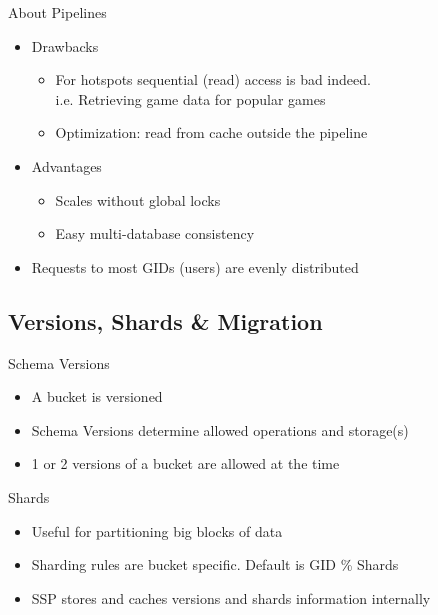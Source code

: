 \documentclass[aspectratio=169]{beamer}
\begin{document}
\begin{frame}{About Pipelines}
    \begin{itemize}
        \item Drawbacks
            \begin{itemize}
                \item For hotspots sequential (read) access is bad indeed.\\
                    i.e. Retrieving game data for popular games
                \item Optimization: read from cache outside the pipeline
            \end{itemize}
        \pause
        \item Advantages
            \begin{itemize}
                \item Scales without global locks
                \item Easy multi-database consistency
            \end{itemize}
        \pause
        \item Requests to most GIDs (users) are evenly distributed
    \end{itemize}
\end{frame}

\subsection{Versions, Shards \& Migration}

\begin{frame}{Schema Versions}
    \begin{itemize}
        \item A bucket is versioned
        \item Schema Versions determine allowed operations and storage(s)
        \item 1 or 2 versions of a bucket are allowed at the time
    \end{itemize}
\end{frame}

\begin{frame}{Shards}
    \begin{itemize}
        \item Useful for partitioning big blocks of data
        \item Sharding rules are bucket specific. Default is GID \% Shards
        \item SSP stores and caches versions and shards information internally
    \end{itemize}
\end{frame}
\end{document}
